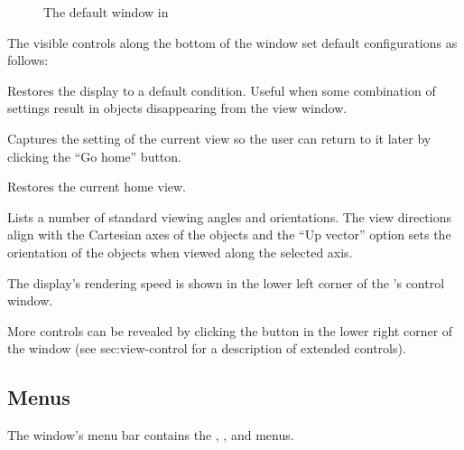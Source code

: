 \begin{figure}[htb]
  \begin{makeimage}
  \end{makeimage}
  \viewerwindow
  \caption{\label{fig:viewwindow} The default \viewer{} window in \SR{}}
\end{figure}


The visible controls along the bottom of the \viewer{} window set default
configurations as follows:
%
\begin{description}
   Restores the display to a default
  condition.  Useful when some combination of settings result in
  objects disappearing from the view window.
  
   Captures the setting of the current view
  so the user can return to it later by clicking the ``Go home''
  button.

   Restores the current home view.
  
   Lists a number of standard viewing angles
  and orientations.  The view directions align with the Cartesian axes
  of the objects and the ``Up vector'' option sets the orientation of
  the objects when viewed along the selected axis.
\end{description}

The display's rendering speed is shown in the lower left corner of the
\viewer{}'s control window.  

More controls can be revealed by clicking the
\latexhtml{\fbox{+}}{\button{[+]}} button in the lower right corner of
the \viewer{} window (see 
{sec:view-control} for a description of extended controls).


\subsection{Menus}

The \viewer{} window's menu bar contains the , ,
and  menus.


